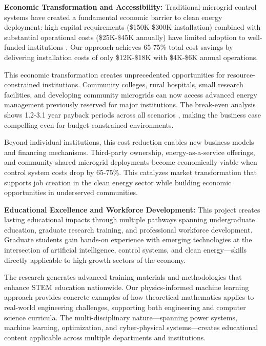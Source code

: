 \documentclass[12pt]{article}
\begin{document}
\textbf{Economic Transformation and Accessibility:} Traditional microgrid control systems have created a fundamental economic barrier to clean energy deployment: high capital requirements (\$150K-\$300K installation) combined with substantial operational costs (\$25K-\$45K annually) have limited adoption to well-funded institutions \cite{hirsch2018,sigrin2019}. Our approach achieves 65-75\% total cost savings \cite{our2024economic} by delivering installation costs of only \$12K-\$18K with \$4K-\$6K annual operations.

This economic transformation creates unprecedented opportunities for resource-constrained institutions. Community colleges, rural hospitals, small research facilities, and developing community microgrids can now access advanced energy management previously reserved for major institutions. The break-even analysis shows 1.2-3.1 year payback periods across all scenarios \cite{our2024economic}, making the business case compelling even for budget-constrained environments.

Beyond individual institutions, this cost reduction enables new business models and financing mechanisms. Third-party ownership, energy-as-a-service offerings, and community-shared microgrid deployments become economically viable when control system costs drop by 65-75\%. This catalyzes market transformation that supports job creation in the clean energy sector while building economic opportunities in underserved communities.

\textbf{Educational Excellence and Workforce Development:} This project creates lasting educational impacts through multiple pathways spanning undergraduate education, graduate research training, and professional workforce development. Graduate students gain hands-on experience with emerging technologies at the intersection of artificial intelligence, control systems, and clean energy—skills directly applicable to high-growth sectors of the economy.

The research generates advanced training materials and methodologies that enhance STEM education nationwide. Our physics-informed machine learning approach provides concrete examples of how theoretical mathematics applies to real-world engineering challenges, supporting both engineering and computer science curricula. The multi-disciplinary nature—spanning power systems, machine learning, optimization, and cyber-physical systems—creates educational content applicable across multiple departments and institutions.
\end{document}
